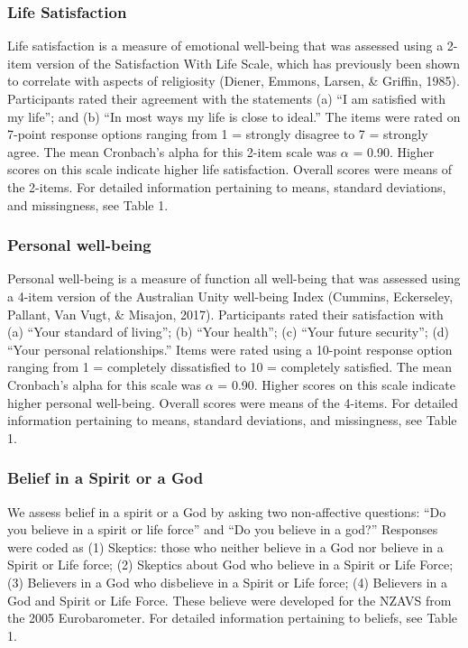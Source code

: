 \documentclass[
  english,
  man,floatsintext]{apa6}
\begin{document}
\hypertarget{life-satisfaction}{%
\subsubsection{Life Satisfaction}\label{life-satisfaction}}

Life satisfaction is a measure of emotional well-being that was assessed using a 2-item version of the Satisfaction With Life Scale, which has previously been shown to correlate with aspects of religiosity (Diener, Emmons, Larsen, \& Griffin, 1985). Participants rated their agreement with the statements (a) \enquote{I am satisfied with my life}; and (b) \enquote{In most ways my life is close to ideal.} The items were rated on 7-point response options ranging from 1 = strongly disagree to 7 = strongly agree. The mean Cronbach's alpha for this 2-item scale was \(\alpha\) = 0.90. Higher scores on this scale indicate higher life satisfaction. Overall scores were means of the 2-items. For detailed information pertaining to means, standard deviations, and missingness, see Table 1.

\hypertarget{personal-well-being}{%
\subsubsection{Personal well-being}\label{personal-well-being}}

Personal well-being is a measure of function all well-being that was assessed using a 4-item version of the Australian Unity well-being Index (Cummins, Eckerseley, Pallant, Van Vugt, \& Misajon, 2017). Participants rated their satisfaction with (a) \enquote{Your standard of living}; (b) \enquote{Your health}; (c) \enquote{Your future security}; (d) \enquote{Your personal relationships.} Items were rated using a 10-point response option ranging from 1 = completely dissatisfied to 10 = completely satisfied. The mean Cronbach's alpha for this scale was \(\alpha\) = 0.90. Higher scores on this scale indicate higher personal well-being. Overall scores were means of the 4-items. For detailed information pertaining to means, standard deviations, and missingness, see Table 1.

\hypertarget{belief-in-a-spirit-or-a-god}{%
\subsubsection{Belief in a Spirit or a God}\label{belief-in-a-spirit-or-a-god}}

We assess belief in a spirit or a God by asking two non-affective questions: \enquote{Do you believe in a spirit or life force} and \enquote{Do you believe in a god?} Responses were coded as (1) Skeptics: those who neither believe in a God nor believe in a Spirit or Life force; (2) Skeptics about God who believe in a Spirit or Life Force; (3) Believers in a God who disbelieve in a Spirit or Life force; (4) Believers in a God and Spirit or Life Force. These believe were developed for the NZAVS from the 2005 Eurobarometer. For detailed information pertaining to beliefs, see Table 1.
\end{document}
